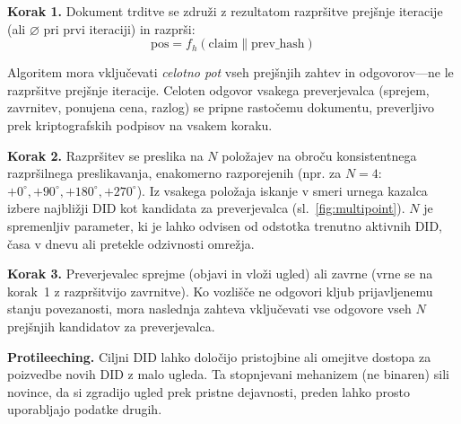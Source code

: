 \documentclass[11pt,a4paper,twocolumn]{article}
\begin{document}
\textbf{Korak 1.} Dokument trditve se združi z rezultatom razpršitve prejšnje iteracije (ali $\varnothing$ pri prvi iteraciji) in razprši:
\begin{equation}
\text{pos} = f_h(\text{claim} \| \text{prev\_hash})
\label{eq:hash}
\end{equation}

Algoritem mora vključevati \emph{celotno pot} vseh prejšnjih zahtev in odgovorov---ne le razpršitve prejšnje iteracije. Celoten odgovor vsakega preverjevalca (sprejem, zavrnitev, ponujena cena, razlog) se pripne rastočemu dokumentu, preverljivo prek kriptografskih podpisov na vsakem koraku.

\textbf{Korak 2.} Razpršitev se preslika na $N$ položajev na obroču konsistentnega razpršilnega preslikavanja, enakomerno razporejenih (npr. za $N=4$: $+0^{\circ}, +90^{\circ}, +180^{\circ}, +270^{\circ}$). Iz vsakega položaja iskanje v smeri urnega kazalca izbere najbližji DID kot kandidata za preverjevalca (sl.~\ref{fig:multipoint}). $N$ je spremenljiv parameter, ki je lahko odvisen od odstotka trenutno aktivnih DID, časa v dnevu ali pretekle odzivnosti omrežja.

\textbf{Korak 3.} Preverjevalec sprejme (objavi in vloži ugled) ali zavrne (vrne se na korak~1 z razpršitvijo zavrnitve). Ko vozlišče ne odgovori kljub prijavljenemu stanju povezanosti, mora naslednja zahteva vključevati vse odgovore vseh $N$ prejšnjih kandidatov za preverjevalca.

\textbf{Protileeching.} Ciljni DID lahko določijo pristojbine ali omejitve dostopa za poizvedbe novih DID z malo ugleda. Ta stopnjevani mehanizem (ne binaren) sili novince, da si zgradijo ugled prek pristne dejavnosti, preden lahko prosto uporabljajo podatke drugih.
\end{document}
